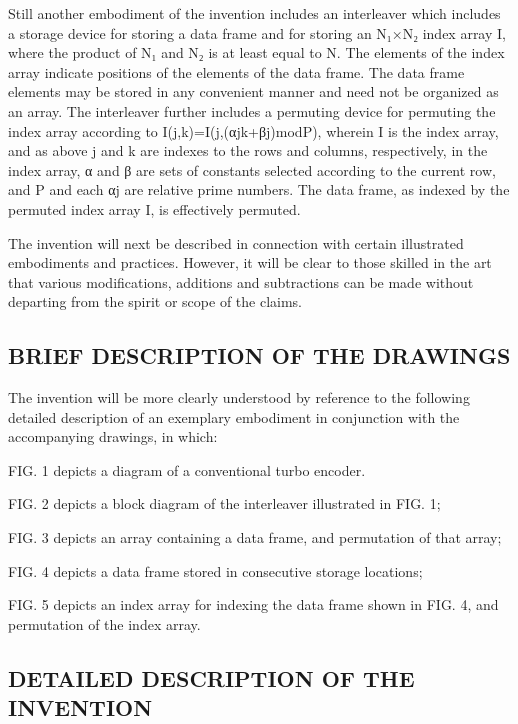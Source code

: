 \documentclass[11pt,a4paper]{article}
\begin{document}
Still another embodiment of the invention includes an interleaver which includes a storage device for storing a data frame and for storing an N₁×N₂ index array I, where the product of N₁ and N₂ is at least equal to N. The elements of the index array indicate positions of the elements of the data frame. The data frame elements may be stored in any convenient manner and need not be organized as an array. The interleaver further includes a permuting device for permuting the index array according to I(j,k)=I(j,(αjk+βj)modP), wherein I is the index array, and as above j and k are indexes to the rows and columns, respectively, in the index array, α and β are sets of constants selected according to the current row, and P and each αj are relative prime numbers. The data frame, as indexed by the permuted index array I, is effectively permuted.

The invention will next be described in connection with certain illustrated embodiments and practices. However, it will be clear to those skilled in the art that various modifications, additions and subtractions can be made without departing from the spirit or scope of the claims.

\subsection{BRIEF DESCRIPTION OF THE DRAWINGS}

The invention will be more clearly understood by reference to the following detailed description of an exemplary embodiment in conjunction with the accompanying drawings, in which:

FIG. 1 depicts a diagram of a conventional turbo encoder.

FIG. 2 depicts a block diagram of the interleaver illustrated in FIG. 1;

FIG. 3 depicts an array containing a data frame, and permutation of that array;

FIG. 4 depicts a data frame stored in consecutive storage locations;

FIG. 5 depicts an index array for indexing the data frame shown in FIG. 4, and permutation of the index array.

\subsection{DETAILED DESCRIPTION OF THE INVENTION}
\end{document}
